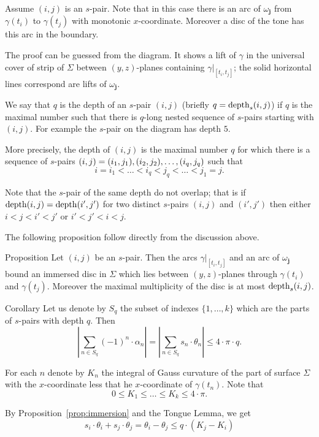 \documentclass[a4paper,10pt]{amsart}
\begin{document}
Assume $(i,j)$ is an $s$-pair.
Note that in this case there is an arc of $\omega_{\bm{j}}$
from $\gamma(t_i)$ to $\gamma(t_j)$
with monotonic $x$-coordinate.
Moreover a disc of the tone has this arc in the boundary.

The proof can be guessed from the diagram.
It shows a lift of $\gamma$ in the universal cover of strip of $\Sigma$ between $(y,z)$-planes containing $\gamma|_{[t_i,t_j]}$;
the solid horizontal lines correspond are lifts of $\omega_{\bm{j}}$.

We say that $q$ is the depth of an $s$-pair $(i,j)$
(briefly $q=\mathop{\rm depth}\nolimits_{s}(i,j)$) 
if $q$ is the maximal number such that there is $q$-long nested sequence of $s$-pairs starting with $(i,j)$.
For example the $s$-pair on the diagram has depth $5$.

More precisely, the depth of $(i,j)$ is the maximal number $q$
for which there is a sequence of $s$-pairs
$(i,j)=(i_1,j_1),(i_2,j_2),\zz\dots,(i_q,j_q)$ such that
\[i=i_1<\dots<i_q<j_q<\dots<j_1=j.\]


Note that the $s$-pair of the same depth do not overlap;
that is if  $\mathop{\rm depth}\nolimits(i,j)=\mathop{\rm depth}\nolimits(i',j')$
for two distinct $s$-pairs $(i,j)$ and $(i',j')$
then either $i<j<i'<j'$ or $i'<j'<i<j$.

The following proposition follow directly from the discussion above.

\begin{thm}{Proposition}\label{prop:immersion}
Let $(i,j)$ be an $s$-pair.
Then the arcs $\gamma|_{[t_i,t_j]}$ and an arc of $\omega_{\bm{j}}$ bound an immersed disc in $\Sigma$ which lies between $(y,z)$-planes through $\gamma(t_i)$ and $\gamma(t_j)$.
Moreover the maximal multiplicity of the disc is at most $\mathop{\rm depth}\nolimits_{s}(i,j)$.
\end{thm}


\begin{thm}{Corollary}\label{cor:Sq}
Let us denote by $S_q$  the subset of indexes $\{1,\dots,k\}$
which are the parts of $s$-pairs with depth $q$.
Then
\[\left|\sum_{n\in S_q}(-1)^n\cdot\alpha_n\right|
=\left|\sum_{n\in S_q}s_n\cdot\theta_n\right|
\le 4\cdot\pi\cdot q.\]
\end{thm}

 For each $n$ denote by $K_n$ the integral of Gauss curvature of the part of surface $\Sigma$ with the $x$-coordinate less that he $x$-coordinate of $\gamma(t_n)$.
Note that 
\[0\le K_1\le\dots\le K_k\le 4\cdot\pi.\]


By Proposition~\ref{prop:immersion} and the Tongue Lemma,
we get
\[s_i\cdot\theta_i+s_j\cdot\theta_j=\theta_i-\theta_j\le q\cdot (K_j-K_i)\]
\end{document}
